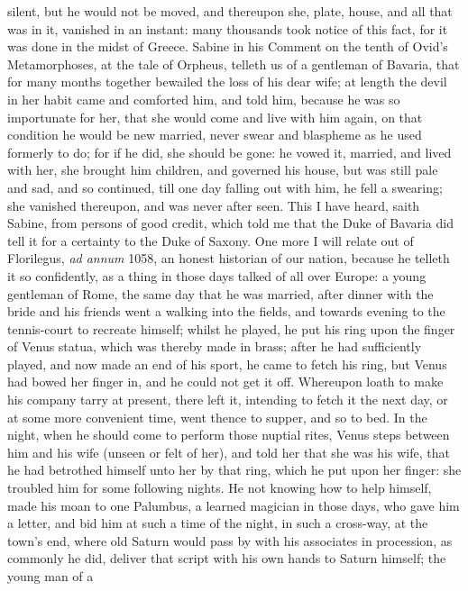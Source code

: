 {silent, but he would not be moved, and thereupon she, plate, house, and
all that was in it, vanished in an instant: many thousands took
notice of this fact, for it was done in the midst of Greece. Sabine in
his Comment on the tenth of Ovid's Metamorphoses, at the tale of
Orpheus, telleth us of a gentleman of Bavaria, that for many months
together bewailed the loss of his dear wife; at length the devil in her
habit came and comforted him, and told him, because he was so
importunate for her, that she would come and live with him again, on
that condition he would be new married, never swear and blaspheme as he
used formerly to do; for if he did, she should be gone: he vowed
it, married, and lived with her, she brought him children, and governed
his house, but was still pale and sad, and so continued, till one day
falling out with him, he fell a swearing; she vanished thereupon, and
was never after seen. This I have heard, saith Sabine, from
persons of good credit, which told me that the Duke of Bavaria did tell
it for a certainty to the Duke of Saxony. One more I will relate out of
Florilegus, \emph{ad annum} 1058, an honest historian of our nation, because
he telleth it so confidently, as a thing in those days talked of all
over Europe: a young gentleman of Rome, the same day that he was
married, after dinner with the bride and his friends went a walking
into the fields, and towards evening to the tennis-court to recreate
himself; whilst he played, he put his ring upon the finger of Venus
statua, which was thereby made in brass; after he had sufficiently
played, and now made an end of his sport, he came to fetch his ring,
but Venus had bowed her finger in, and he could not get it off.
Whereupon loath to make his company tarry at present, there left it,
intending to fetch it the next day, or at some more convenient time,
went thence to supper, and so to bed. In the night, when he should come
to perform those nuptial rites, Venus steps between him and his wife
(unseen or felt of her), and told her that she was his wife, that he
had betrothed himself unto her by that ring, which he put upon her
finger: she troubled him for some following nights. He not knowing how
to help himself, made his moan to one Palumbus, a learned magician in
those days, who gave him a letter, and bid him at such a time of the
night, in such a cross-way, at the town's end, where old Saturn would
pass by with his associates in procession, as commonly he did, deliver
that script with his own hands to Saturn himself; the young man of a
}

